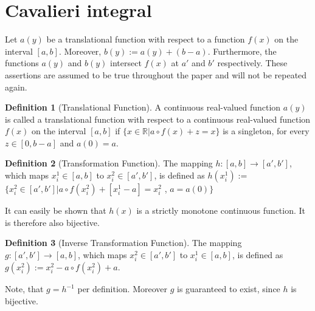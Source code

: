 \documentclass{article}
\theoremstyle{theorem}
\theoremstyle{definition}
\newtheorem*{definition}{Definition}
\begin{document}
\section{Cavalieri integral}
Let $a(y)$ be a translational function with respect to a function $f(x)$ on the interval $[a,b]$. Moreover, $b(y) := a(y) + (b-a)$. Furthermore, the functions $a(y)$ and $b(y)$ intersect $f(x)$ at $a'$ and $b'$ respectively.
These assertions are assumed to be true throughout the paper and will not be repeated again.

\begin{definition}[Translational Function]
A continuous real-valued function $a(y)$ is called a translational function with respect to a continuous real-valued function $f(x)$ on the interval $[a,b]$ if 
$\{x\in\mathbb{R}|a\circ f(x) + z = x\}$ is a singleton, for every $z\in[0,b-a]$ and $a(0) = a$.
\end{definition}

\begin{definition}[Transformation Function]
The mapping $h : [a, b] \rightarrow [a',b']$, which maps $x_i^1 \in [a, b]$ to $x_i^2 \in [a',b']$, is defined as
$h(x_i^1) :=$ $\{x_i^2 \in [a' ,b'] | a\circ f(x_i^2) + [x_i^1 - a] = x_i^2$ , $a = a(0)\}$
\end{definition}

\noindent
It can easily be shown that $h(x)$ is a strictly monotone continuous function. It is therefore also bijective. 

\begin{definition}[Inverse Transformation Function]
The mapping $g:[a', b'] \rightarrow [a, b]$, which maps $x_i^2 \in [a' , b']$ to $x_i^1\in [a, b]$,
is defined as $g(x_i^2) := x_i^2 - a \circ f (x_i^2) + a$.
\end{definition}

\noindent
Note, that $g = h^{-1}$ per definition. Moreover $g$ is guaranteed to exist, since $h$ is bijective. 
\end{document}
